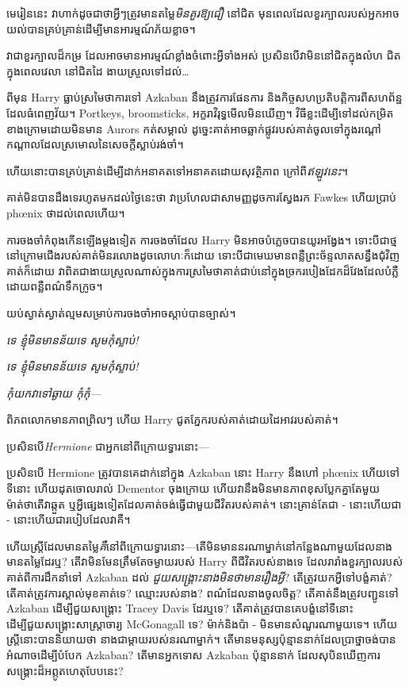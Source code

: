 មេរៀននេះ វាហាក់ដូចជាថាអ្វីៗត្រូវមានតម្លៃ\emph{មិនគួរឱ្យជឿ} នៅជិត មុនពេលដែលខួរក្បាលរបស់អ្នកអាចយល់បានគ្រប់គ្រាន់ដើម្បីមានអារម្មណ៍ភ័យខ្លាច។

វាជាខួរក្បាលដ៏កម្រ ដែលអាចមានអារម្មណ៍ខ្លាំងចំពោះអ្វីទាំងអស់ ប្រសិនបើវាមិននៅជិតក្នុងលំហ ជិតក្នុងពេលវេលា នៅជិតដៃ ងាយស្រួលទៅដល់…

ពីមុន Harry ធ្លាប់ស្រមៃថាការទៅ Azkaban នឹងត្រូវការផែនការ និងកិច្ចសហប្រតិបត្តិការពីសហព័ន្ឋដែលធំពេញវ័យ។ Portkeys, broomsticks, អក្ខរាវិរុទ្ធមើលមិនឃើញ។ វិធីខ្លះដើម្បីទៅដល់កម្រិតខាងក្រោមដោយមិនមាន Aurors កត់សម្គាល់ ដូច្នេះគាត់អាចឆ្លាក់ផ្លូវរបស់គាត់ចូលទៅក្នុងរណ្តៅកណ្តាលដែលស្រមោលនៃសេចក្តីស្លាប់រង់ចាំ។

ហើយនោះបានគ្រប់គ្រាន់ដើម្បីដាក់អនាគតទៅអនាគតដោយសុវត្ថិភាព ក្រៅពី\emph{ឥឡូវនេះ}។

គាត់មិនបានដឹងទេរហូតមកដល់ថ្ងៃនេះថា វាប្រហែលជាសាមញ្ញដូចការស្វែងរក Fawkes ហើយប្រាប់ phœnix ថាដល់ពេលហើយ។

ការចងចាំកំពុងកើនឡើងម្តងទៀត ការចងចាំដែល Harry មិនអាចបំភ្លេចបានយូរអង្វែង។ ទោះបីជាថ្មនៅក្រោមជើងរបស់គាត់មិនរលោងដូចលោហៈក៏ដោយ ទោះបីជាមេឃមានពន្លឺព្រះច័ន្ទលាតសន្ធឹងជុំវិញគាត់ក៏ដោយ វាពិតជាងាយស្រួលណាស់ក្នុងការស្រមៃថាគាត់ជាប់នៅក្នុងច្រករបៀងដែកដ៏វែងដែលបំភ្លឺដោយពន្លឺពណ៌ទឹកក្រូច។

យប់​ស្ងាត់​ស្ងាត់​ល្មម​សម្រាប់​ការ​ចង​ចាំ​អាច​ស្តាប់​បាន​ច្បាស់។

\emph{ទេ ខ្ញុំមិនមានន័យទេ សូមកុំស្លាប់!}

\emph{ទេ ខ្ញុំមិនមានន័យទេ សូមកុំស្លាប់!}

\emph{កុំយកវាទៅឆ្ងាយ កុំកុំ—}

ពិភពលោកមានភាពព្រិលៗ ហើយ Harry ជូតភ្នែករបស់គាត់ដោយដៃអាវរបស់គាត់។

ប្រសិនបើ\emph{Hermione} ជាអ្នកនៅពីក្រោយទ្វារនោះ—

ប្រសិនបើ Hermione ត្រូវបានគេដាក់នៅក្នុង Azkaban នោះ Harry នឹងហៅ phœnix ហើយទៅទីនោះ ហើយដុតចោលរាល់ Dementor ចុងក្រោយ ហើយវានឹងមិនមានភាពខុសប្លែកគ្នាតែមួយម៉ាត់ថាតើវាឆ្កួត ឬអ្វីផ្សេងទៀតដែលគាត់ចង់ធ្វើជាមួយជីវិតរបស់គាត់។ នោះគ្រាន់តែជា - នោះហើយជា - នោះហើយជារបៀបដែលវាគឺ។

ហើយស្ត្រីដែលមានតម្លៃ\emph{គឺ}នៅពីក្រោយទ្វារនោះ—តើមិនមាននរណាម្នាក់នៅកន្លែងណាមួយដែលនាងមានតម្លៃដែរឬ? តើវាមិនមែនត្រឹមតែចម្ងាយរបស់ Harry ពីជីវិតរបស់នាងទេ ដែលរារាំងខួរក្បាលរបស់គាត់ពីការដឹកនាំទៅ Azkaban ដល់ \emph{ ជួយសង្រ្គោះនាងមិនថាមានរឿងអ្វី}? តើ​ត្រូវ​យក​អ្វី​ទៅ​បង្ខំ​គាត់? តើគាត់ត្រូវការស្គាល់មុខគាត់ទេ? ឈ្មោះរបស់នាង? ពណ៌ដែលនាងចូលចិត្ត? តើគាត់នឹងត្រូវបញ្ជូនទៅ Azkaban ដើម្បីជួយសង្គ្រោះ Tracey Davis ដែរឬទេ? តើគាត់ត្រូវបានគេបង្ខំនៅទីនោះដើម្បីជួយសង្គ្រោះសាស្រ្តាចារ្យ McGonagall ទេ? ម៉ាក់និងប៉ា - មិនមានសំណួរណាមួយទេ។ ហើយ​ស្ត្រី​នោះ​បាន​និយាយ​ថា នាង​ជា​ម្តាយ​របស់​នរណា​ម្នាក់។ តើមានមនុស្សប៉ុន្មាននាក់ដែលប្រាថ្នាចង់បានអំណាចដើម្បីបំបែក Azkaban? តើមានអ្នកទោស Azkaban ប៉ុន្មាននាក់ ដែលសុបិនឃើញការសង្គ្រោះដ៏អព្ភូតហេតុបែបនេះ?

